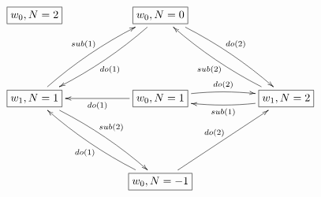 $\xymatrix{
\fbox{$\location_0, N=2$} && \fbox{$\location_0, N=0$} \ar@/^/[ddll]^{do(1)} \ar@/^/[ddrr]^{do(2)} && \\ \\
 \fbox{$\location_1, N=1$} \ar@/^/[uurr]^{sub(1)} \ar@/^/[ddrr]^{sub(2)} && \fbox{$\location_0, N=1$} \ar[ll]^{do(1)} \ar@/^/[rr]^{do(2)} && \fbox{$\location_1, N=2$} \ar@/^/[ll]^{sub(1)} \ar@/^/[uull]^{sub(2)} \\\\
 && \fbox{$\location_0, N=-1$} \ar@/^/[uull]^{do(1)} \ar[uurr]^{do(2)}}$
